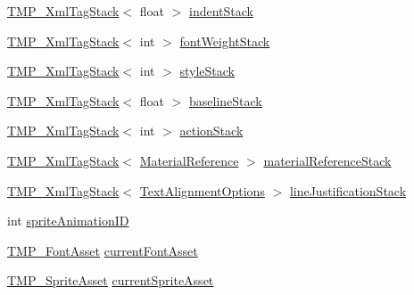\begin{DoxyCompactItemize}
\item 
\mbox{\hyperlink{struct_t_m_pro_1_1_t_m_p___xml_tag_stack}{T\+M\+P\+\_\+\+Xml\+Tag\+Stack}}$<$ float $>$ \mbox{\hyperlink{struct_t_m_pro_1_1_word_wrap_state_a7898c7f99240bf8b368ab07e0836b22d}{indent\+Stack}}
\item 
\mbox{\hyperlink{struct_t_m_pro_1_1_t_m_p___xml_tag_stack}{T\+M\+P\+\_\+\+Xml\+Tag\+Stack}}$<$ int $>$ \mbox{\hyperlink{struct_t_m_pro_1_1_word_wrap_state_aab638c6b73c66561dfabffe5b9c893f2}{font\+Weight\+Stack}}
\item 
\mbox{\hyperlink{struct_t_m_pro_1_1_t_m_p___xml_tag_stack}{T\+M\+P\+\_\+\+Xml\+Tag\+Stack}}$<$ int $>$ \mbox{\hyperlink{struct_t_m_pro_1_1_word_wrap_state_aa333c2c26d8fb9e5107d82bb86b645d7}{style\+Stack}}
\item 
\mbox{\hyperlink{struct_t_m_pro_1_1_t_m_p___xml_tag_stack}{T\+M\+P\+\_\+\+Xml\+Tag\+Stack}}$<$ float $>$ \mbox{\hyperlink{struct_t_m_pro_1_1_word_wrap_state_ae00bfb7082da1925569a68bdf8a6b4ab}{baseline\+Stack}}
\item 
\mbox{\hyperlink{struct_t_m_pro_1_1_t_m_p___xml_tag_stack}{T\+M\+P\+\_\+\+Xml\+Tag\+Stack}}$<$ int $>$ \mbox{\hyperlink{struct_t_m_pro_1_1_word_wrap_state_a2f76d3d72e75992daa72b29bda31c649}{action\+Stack}}
\item 
\mbox{\hyperlink{struct_t_m_pro_1_1_t_m_p___xml_tag_stack}{T\+M\+P\+\_\+\+Xml\+Tag\+Stack}}$<$ \mbox{\hyperlink{struct_t_m_pro_1_1_material_reference}{Material\+Reference}} $>$ \mbox{\hyperlink{struct_t_m_pro_1_1_word_wrap_state_a6f1f0d31190704f065ef9afc9e0a44a6}{material\+Reference\+Stack}}
\item 
\mbox{\hyperlink{struct_t_m_pro_1_1_t_m_p___xml_tag_stack}{T\+M\+P\+\_\+\+Xml\+Tag\+Stack}}$<$ \mbox{\hyperlink{namespace_t_m_pro_a1dd743b58b1fd4057c00e4b98ab86301}{Text\+Alignment\+Options}} $>$ \mbox{\hyperlink{struct_t_m_pro_1_1_word_wrap_state_a1cb20837c77f7bae3aa21240b625ef2f}{line\+Justification\+Stack}}
\item 
int \mbox{\hyperlink{struct_t_m_pro_1_1_word_wrap_state_a4e799ed364696e2aa7bc9882e196f573}{sprite\+Animation\+ID}}
\item 
\mbox{\hyperlink{class_t_m_pro_1_1_t_m_p___font_asset}{T\+M\+P\+\_\+\+Font\+Asset}} \mbox{\hyperlink{struct_t_m_pro_1_1_word_wrap_state_ac4e0f73280095c102ed208e1341231ae}{current\+Font\+Asset}}
\item 
\mbox{\hyperlink{class_t_m_pro_1_1_t_m_p___sprite_asset}{T\+M\+P\+\_\+\+Sprite\+Asset}} \mbox{\hyperlink{struct_t_m_pro_1_1_word_wrap_state_a5a7ba86c9aa5b718e7efd9c60a4aaaf6}{current\+Sprite\+Asset}}

\end{DoxyCompactItemize}
